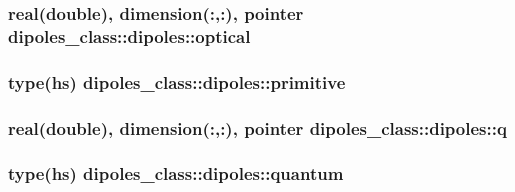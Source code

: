 \hypertarget{structdipoles__class_1_1dipoles_a7a0b0cffbbb4e48c4bced86e3684ac14}{
\subsubsection[{optical}]{\setlength{\rightskip}{0pt plus 5cm}real(double), dimension(\+:,\+:), pointer dipoles\+\_\+class\+::dipoles\+::optical\hspace{0.3cm}{\ttfamily [private]}}}\label{structdipoles__class_1_1dipoles_a7a0b0cffbbb4e48c4bced86e3684ac14}
\hypertarget{structdipoles__class_1_1dipoles_a56b509ba86b8121570bd7a051cc77fd9}{
\subsubsection[{primitive}]{\setlength{\rightskip}{0pt plus 5cm}type({\bf hs}) dipoles\+\_\+class\+::dipoles\+::primitive\hspace{0.3cm}{\ttfamily [private]}}}\label{structdipoles__class_1_1dipoles_a56b509ba86b8121570bd7a051cc77fd9}
\hypertarget{structdipoles__class_1_1dipoles_ab97f9dcc84c8fafe029986f103d99630}{
\subsubsection[{q}]{\setlength{\rightskip}{0pt plus 5cm}real(double), dimension(\+:,\+:), pointer dipoles\+\_\+class\+::dipoles\+::q\hspace{0.3cm}{\ttfamily [private]}}}\label{structdipoles__class_1_1dipoles_ab97f9dcc84c8fafe029986f103d99630}
\hypertarget{structdipoles__class_1_1dipoles_a7b6d2a8feca2c1198896fb10627d029b}{
\subsubsection[{quantum}]{\setlength{\rightskip}{0pt plus 5cm}type({\bf hs}) dipoles\+\_\+class\+::dipoles\+::quantum\hspace{0.3cm}{\ttfamily [private]}}}\label{structdipoles__class_1_1dipoles_a7b6d2a8feca2c1198896fb10627d029b}
